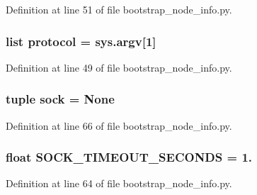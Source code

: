Definition at line 51 of file bootstrap\+\_\+node\+\_\+info.\+py.

\hypertarget{namespacebootstrap__node__info_aafd839aa9fcaf8a9b730a927a5b3cd42}{
\subsubsection[{protocol}]{\setlength{\rightskip}{0pt plus 5cm}list protocol = sys.\+argv\mbox{[}1\mbox{]}}}\label{namespacebootstrap__node__info_aafd839aa9fcaf8a9b730a927a5b3cd42}


Definition at line 49 of file bootstrap\+\_\+node\+\_\+info.\+py.

\hypertarget{namespacebootstrap__node__info_a5197c5e95ad6e5e67d13d75358f44685}{
\subsubsection[{sock}]{\setlength{\rightskip}{0pt plus 5cm}tuple sock = None}}\label{namespacebootstrap__node__info_a5197c5e95ad6e5e67d13d75358f44685}


Definition at line 66 of file bootstrap\+\_\+node\+\_\+info.\+py.

\hypertarget{namespacebootstrap__node__info_a23dee041a4e7901c895225d0942f42c8}{
\subsubsection[{S\+O\+C\+K\+\_\+\+T\+I\+M\+E\+O\+U\+T\+\_\+\+S\+E\+C\+O\+N\+D\+S}]{\setlength{\rightskip}{0pt plus 5cm}float S\+O\+C\+K\+\_\+\+T\+I\+M\+E\+O\+U\+T\+\_\+\+S\+E\+C\+O\+N\+D\+S = 1.}}\label{namespacebootstrap__node__info_a23dee041a4e7901c895225d0942f42c8}


Definition at line 64 of file bootstrap\+\_\+node\+\_\+info.\+py.

